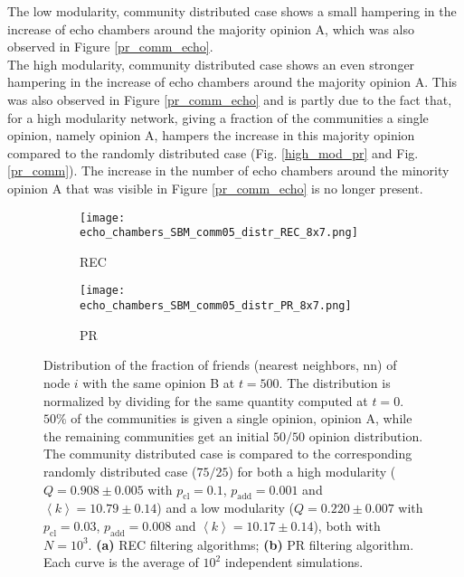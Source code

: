 \documentclass[11 pt , letterpaper , twoside , openright]{book}
\begin{document}
\newline
The low modularity, community distributed case shows a small hampering in the increase of echo chambers around the majority opinion A, which was also observed in Figure \ref{pr_comm_echo}.\\
\newline
The high modularity, community distributed case shows an even stronger hampering in the increase of echo chambers around the majority opinion A. This was also observed in Figure \ref{pr_comm_echo} and is partly due to the fact that, for a high modularity network, giving a fraction of the communities a single opinion, namely opinion A, hampers the increase in this majority opinion compared to the randomly distributed case (Fig. \ref{high_mod_pr} and Fig. \ref{pr_comm}). The increase in the number of echo chambers around the minority opinion A that was visible in Figure \ref{pr_comm_echo} is no longer present.

\begin{figure}[H]
  \begin{subfigure}[b]{0.49\textwidth}
    \caption{REC}
  	\texttt{[image: echo\_chambers\_SBM\_comm05\_distr\_REC\_8x7.png]}
    \label{rec_comm05_echo}
  \end{subfigure}
  \begin{subfigure}[b]{0.49\textwidth}
    \caption{PR}
  	\texttt{[image: echo\_chambers\_SBM\_comm05\_distr\_PR\_8x7.png]}
    \label{pr_comm05_echo}
  \end{subfigure}
  \captionsetup{format=plain}
  \caption[Distribution of the fraction of friends (nearest neighbors, nn) of node $i$ with the same opinion B at $t = 500$. $50 \%$ of the communities is given a single opinion, opinion A, while the remaining communities get an initial $50/50$ opinion distribution. The community distributed case is compared to the corresponding randomly distributed case ($75/25$) for both a high modularity and a low modularity network. Results for the REC and PR filtering algorithm.]{Distribution of the fraction of friends (nearest neighbors, nn) of node $i$ with the same opinion B at $t = 500$. The distribution is normalized by dividing for the same quantity computed at $t=0$. $50 \%$ of the communities is given a single opinion, opinion A, while the remaining communities get an initial $50/50$ opinion distribution. The community distributed case is compared to the corresponding randomly distributed case ($75/25$) for both a high modularity ($Q = 0.908 \pm 0.005$ with $p_{\text{cl}} = 0.1$, $p_{\text{add}} = 0.001$ and $\left<k\right> = 10.79 \pm 0.14$) and a low modularity ($Q = 0.220 \pm 0.007$ with $p_{\text{cl}} = 0.03$, $p_{\text{add}} = 0.008$ and $\left<k\right> = 10.17 \pm 0.14$), both with $N=10^3$. \textbf{(a)} REC filtering algorithms; \textbf{(b)} PR filtering algorithm. Each curve is the average of $10^2$ independent simulations.}
\label{echo_05_commOp0_other_50-50}
\end{figure}
\end{document}
